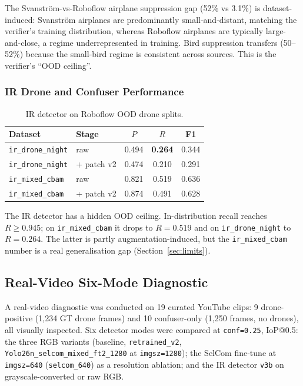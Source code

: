 The Svanstr\"om-vs-Roboflow airplane suppression gap (52\% vs 3.1\%) is dataset-induced: Svanstr\"om airplanes are predominantly small-and-distant, matching the verifier's training distribution, whereas Roboflow airplanes are typically large-and-close, a regime underrepresented in training. Bird suppression transfers (50--52\%) because the small-bird regime is consistent across sources. This is the verifier's ``OOD ceiling''.

\subsubsection{IR Drone and Confuser Performance}

\begin{table}[htbp]
    \centering
    \caption{IR detector on Roboflow OOD drone splits.}
    \label{tab:ood_ir}
    \begin{tabular}{llccc}
        \toprule
        Dataset & Stage & $P$ & $R$ & F1 \\
        \midrule
        \texttt{ir\_drone\_night} & raw & 0.494 & \textbf{0.264} & 0.344 \\
        \texttt{ir\_drone\_night} & + patch v2 & 0.474 & 0.210 & 0.291 \\
        \texttt{ir\_mixed\_cbam}  & raw & 0.821 & 0.519 & 0.636 \\
        \texttt{ir\_mixed\_cbam}  & + patch v2 & 0.874 & 0.491 & 0.628 \\
        \bottomrule
    \end{tabular}
\end{table}

The IR detector has a hidden OOD ceiling. In-distribution recall reaches $R \geq 0.945$; on \texttt{ir\_mixed\_cbam} it drops to $R=0.519$ and on \texttt{ir\_drone\_night} to $R=0.264$. The latter is partly augmentation-induced, but the \texttt{ir\_mixed\_cbam} number is a real generalisation gap (Section~\ref{sec:limits}).

\subsection{Real-Video Six-Mode Diagnostic}
\label{sec:realvideo}

A real-video diagnostic was conducted on 19 curated YouTube clips: 9 drone-positive (1{,}234 GT drone frames) and 10 confuser-only (1{,}250 frames, no drones), all visually inspected. Six detector modes were compared at \texttt{conf=0.25}, IoP@0.5: the three RGB variants (baseline, \texttt{retrained\_v2}, \texttt{Yolo26n\_selcom\_mixed\_ft2\_1280} at \texttt{imgsz=1280}); the SelCom fine-tune at \texttt{imgsz=640} (\texttt{selcom\_640}) as a resolution ablation; and the IR detector \texttt{v3b} on grayscale-converted or raw RGB.

